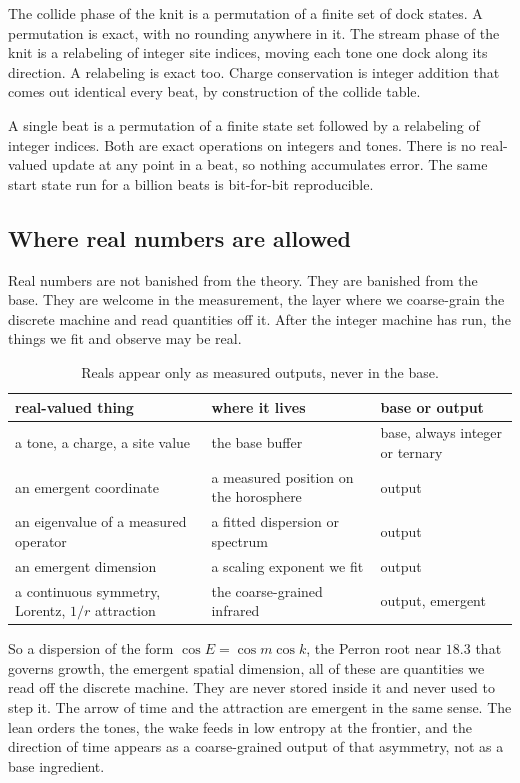 The collide phase of the knit is a permutation of a finite set of dock states. A permutation is exact, with no rounding anywhere in it. The stream phase of the knit is a relabeling of integer site indices, moving each tone one dock along its direction. A relabeling is exact too. Charge conservation is integer addition that comes out identical every beat, by construction of the collide table.

\begin{proposition}
A single beat is a permutation of a finite state set followed by a relabeling of integer indices. Both are exact operations on integers and tones. There is no real-valued update at any point in a beat, so nothing accumulates error. The same start state run for a billion beats is bit-for-bit reproducible.
\end{proposition}

\subsection{Where real numbers are allowed}

Real numbers are not banished from the theory. They are banished from the base. They are welcome in the measurement, the layer where we coarse-grain the discrete machine and read quantities off it. After the integer machine has run, the things we fit and observe may be real.

\begin{table}[ht]
\centering
\begin{tabular}{@{}lll@{}}
\toprule
real-valued thing & where it lives & base or output \\
\midrule
a tone, a charge, a site value & the base buffer & base, always integer or ternary \\
an emergent coordinate & a measured position on the horosphere & output \\
an eigenvalue of a measured operator & a fitted dispersion or spectrum & output \\
an emergent dimension & a scaling exponent we fit & output \\
a continuous symmetry, Lorentz, $1/r$ attraction & the coarse-grained infrared & output, emergent \\
\bottomrule
\end{tabular}
\caption{Reals appear only as measured outputs, never in the base.}
\label{tab:reals-as-output}
\end{table}

So a dispersion of the form $\cos E = \cos m \cos k$, the Perron root near $18.3$ that governs growth, the emergent spatial dimension, all of these are quantities we read off the discrete machine. They are never stored inside it and never used to step it. The arrow of time and the attraction are emergent in the same sense. The lean orders the tones, the wake feeds in low entropy at the frontier, and the direction of time appears as a coarse-grained output of that asymmetry, not as a base ingredient.

